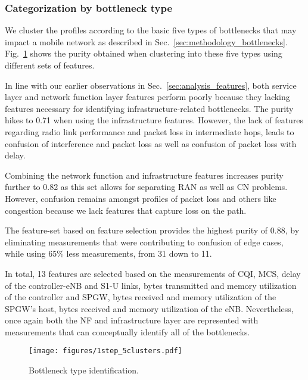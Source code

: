 \documentclass[journal,comsoc]{IEEEtran}
\begin{document}
%
\subsubsection{Categorization by bottleneck type}
\label{sec:bottlenecks_1step5}

%
We cluster the profiles according to the basic five types of bottlenecks that may impact a mobile network as described in Sec.~\ref{sec:methodology_bottlenecks}.
Fig.~\ref{fig:1step_5clusters} shows the purity obtained when clustering into these five types using different sets of features.

%
In line with our earlier observations in Sec.~\ref{sec:analysis_features}, both service layer and network function layer features perform poorly because they lacking features necessary for identifying infrastructure-related bottlenecks.
The purity hikes to 0.71 when using the infrastructure features.
However, the lack of features regarding radio link performance and packet loss in intermediate hops, leads to confusion of interference and packet loss as well as confusion of packet loss with delay.

% 
Combining the network function and infrastructure features increases purity further to 0.82 as this set allows for separating RAN as well as CN problems.
However, confusion remains amongst profiles of packet loss and others like congestion because we lack features that capture loss on the path.

%
The feature-set based on feature selection provides the highest purity of 0.88, by eliminating measurements that were contributing to confusion of edge cases, while using 65\% less measurements, from 31 down to 11.

In total, 13 features are selected based on the measurements of CQI, MCS, delay of the controller-eNB and S1-U links, bytes transmitted and memory utilization of the controller and SPGW, bytes received and memory utilization of the SPGW's host, bytes received and memory utilization of the eNB.
Nevertheless, once again both the NF and infrastructure layer are represented with measurements that can conceptually identify all of the bottlenecks.



%
\begin{figure}[t]
	\centering
	\texttt{[image: figures/1step\_5clusters.pdf]}
	\vspace{-6mm}
	\caption{Bottleneck type identification.}
	\vspace{-4mm}
	\label{fig:1step_5clusters}
\end{figure}
\end{document}

